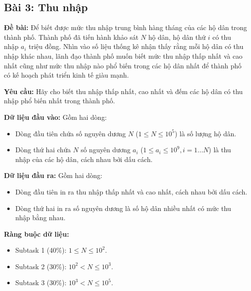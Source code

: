 \documentclass[12pt]{scrartcl}  %
\begin{document}
\subsection{Bài 3: Thu nhập}
\textbf{Đề bài:}
Để biết được mức thu nhập trung bình hàng tháng của các hộ dân trong thành phố. Thành phố đã tiến hành khảo sát $N$ hộ dân, hộ dân thứ $i$ có thu nhập $a_i$ triệu đồng. Nhìn vào số liệu thống kê nhận thấy rằng mỗi hộ dân có thu nhập khác nhau, lãnh đạo thành phố muốn biết mức thu nhập thấp nhất và cao nhất cũng như mức thu nhập nào phổ biến trong các hộ dân nhất để thành phố có kế hoạch phát triển kinh tế giàu mạnh.

\textbf{Yêu cầu:}
Hãy cho biết thu nhập thấp nhất, cao nhất và đếm các hộ dân có thu nhập phổ biến nhất trong thành phố.

\textbf{Dữ liệu đầu vào:}
Gồm hai dòng:
\begin{itemize}
    \item Dòng đầu tiên chứa số nguyên dương $N$ ($1 \leq N \leq 10^5$) là số lượng hộ dân.
    \item Dòng thứ hai chứa $N$ số nguyên dương $a_i$ ($1 \leq a_i \leq 10^9, i = 1 ... N$) là thu nhập của các hộ dân, cách nhau bởi dấu cách.
\end{itemize}

\textbf{Dữ liệu đầu ra:}
Gồm hai dòng:

\begin{itemize}
    \item Dòng đầu tiên in ra thu nhập thấp nhất và cao nhất, cách nhau bởi dấu cách.
    \item Dòng thứ hai in ra số nguyên dương là số hộ dân nhiều nhất có mức thu nhập bằng nhau.
\end{itemize}

\textbf{Ràng buộc dữ liệu:}
\begin{itemize}
    \item Subtask 1 (40\%): $1 \leq N \leq 10^2$.
    \item Subtask 2 (30\%): $10^2 < N \leq 10^3$.
    \item Subtask 3 (30\%): $10^3 < N \leq 10^5$.
\end{itemize}
\end{document}
